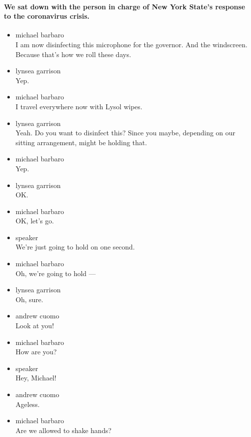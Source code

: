 \hypertarget{we-sat-down-with-the-person-in-charge-of-new-york-states-response-to-the-coronavirus-crisis}{%
\paragraph{We sat down with the person in charge of New York State's
response to the coronavirus
crisis.}\label{we-sat-down-with-the-person-in-charge-of-new-york-states-response-to-the-coronavirus-crisis}}

\begin{itemize}
\item
  michael barbaro\\
  I am now disinfecting this microphone for the governor. And the
  windscreen. Because that's how we roll these days.
\item
  lynsea garrison\\
  Yep.
\item
  michael barbaro\\
  I travel everywhere now with Lysol wipes.
\item
  lynsea garrison\\
  Yeah. Do you want to disinfect this? Since you maybe, depending on our
  sitting arrangement, might be holding that.
\item
  michael barbaro\\
  Yep.
\item
  lynsea garrison\\
  OK.
\item
  michael barbaro\\
  OK, let's go.
\item
  speaker\\
  We're just going to hold on one second.
\item
  michael barbaro\\
  Oh, we're going to hold ---
\item
  lynsea garrison\\
  Oh, sure.
\item
  andrew cuomo\\
  Look at you!
\item
  michael barbaro\\
  How are you?
\item
  speaker\\
  Hey, Michael!
\item
  andrew cuomo\\
  Ageless.
\item
  michael barbaro\\
  Are we allowed to shake hands?

\end{itemize}

